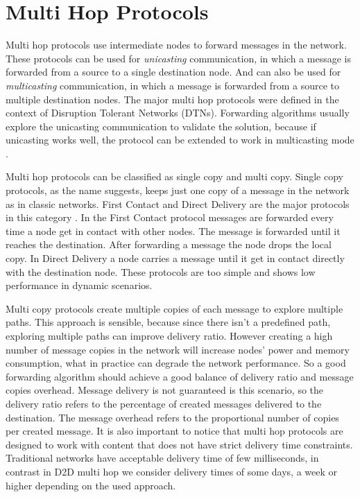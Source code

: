 \section{Multi Hop Protocols}

Multi hop protocols use intermediate nodes to forward messages in the network. These protocols can be used for \textit{unicasting} communication, in which a message is forwarded from
a source to a single destination node. And can also be used for \textit{multicasting} communication, in which a message is forwarded from a source to multiple destination nodes.
The major multi hop protocols were defined in the context of Disruption Tolerant Networks (DTNs).
Forwarding algorithms usually explore the unicasting communication to validate the solution, because if unicasting works well, the protocol can be extended to work in multicasting mode \cite{misra2016opportunistic}.

Multi hop protocols can be classified as single copy and multi copy. Single copy protocols, as the name suggests, keeps just one copy of a message in the network as in classic networks.
First Contact and Direct Delivery are the major protocols in this category \cite{misra2016opportunistic}. In the First Contact protocol messages are forwarded every time a node get in contact with other nodes. The message
is forwarded until it reaches the destination. After forwarding a message the node drops the local copy. In Direct Delivery a node carries a message until it get in contact directly with
the destination node. These protocols are too simple and shows low performance in dynamic scenarios.

Multi copy protocols create multiple copies of each message to explore multiple paths. This approach is sensible, because since there isn't a predefined path, exploring multiple paths
can improve delivery ratio. However creating a high number of message copies in the network will increase nodes' power and memory consumption, what in practice can degrade the network
performance. So a good forwarding algorithm should achieve a good balance of delivery ratio and message copies overhead. Message delivery is not guaranteed is this scenario, so the
delivery ratio refers to the percentage of created messages delivered to the destination. The message overhead refers to the proportional number of
copies per created message. It is also important to notice that multi hop protocols are designed to work with content that does not have strict delivery time constraints. Traditional networks have acceptable
delivery time of few milliseconds, in contrast in D2D multi hop we consider delivery times of some days, a week or higher depending on the used approach.

